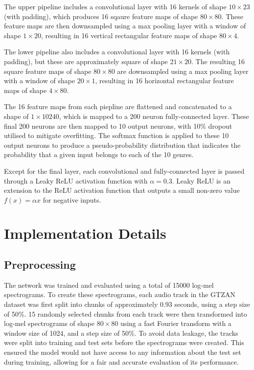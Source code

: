 \documentclass[conference]{IEEEtran}
\begin{document}
The upper pipeline includes a convolutional layer with 16 kernels of shape $10\times23$ (with padding), which produces 16 sqaure feature maps of shape $80\times80$.
These feature maps are then downsampled using a max pooling layer with a window of shape $1\times20$, resulting in 16 vertical rectangular feature maps of shape $80\times4$.

The lower pipeline also includes a convolutional layer with 16 kernels (with padding), but these are approximately square of shape $21\times20$.
The resulting 16 square feature maps of shape $80\times80$ are downsampled using a max pooling layer with a window of shape $20\times1$, resulting in 16 horizontal rectangular feature maps of shape $4\times80$.

The 16 feature maps from each piepline are flattened and concatenated to a shape of $1\times10240$, which is mapped to a 200 neuron fully-connected layer.
These final 200 neurons are then mapped to 10 output neurons, with 10\% dropout utilised to mitigate overfitting.
The softmax function is applied to these 10 output neurons to produce a pseudo-probability distribution that indicates the probability that a given input belongs to each of the 10 genres.

Except for the final layer, each convolutional and fully-connected layer is passed through a Leaky ReLU activation function with $\alpha=0.3$.
Leaky ReLU is an extension to the ReLU activation function that outputs a small non-zero value $f(x) = \alpha x$ for negative inputs.

\section{Implementation Details}

\subsection{Preprocessing}

The network was trained and evaluated using a total of 15000 log-mel spectrograms.
To create these spectrograms, each audio track in the GTZAN dataset was first split into chunks of approximately 0.93 seconds, using a step size of 50\%.
15 randomly selected chunks from each track were then transformed into log-mel spectrograms of shape $80\times80$ using a fast Fourier transform with a window size of 1024, and a step size of 50\%.
To avoid data leakage, the tracks were split into training and test sets before the spectrograms were created.
This ensured the model would not have access to any information about the test set during training, allowing for a fair and accurate evaluation of its performance.
\end{document}
